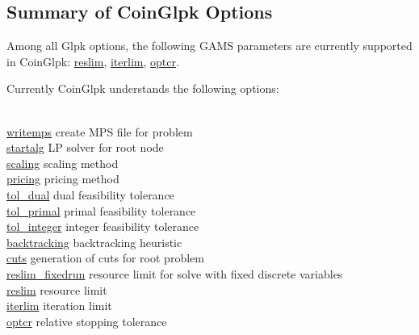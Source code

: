 \subsection{Summary of CoinGlpk Options}

Among all Glpk options, the following GAMS parameters are currently supported in CoinGlpk:
\hyperlink{glpkreslim}{reslim}, \hyperlink{glpkiterlim}{iterlim}, \hyperlink{glpkoptcr}{optcr}.

Currently CoinGlpk understands the following options:
\begin{tabbing}
\hspace {1.0in} \= \\
\hyperlink{glpkwritemps}
{writemps} \> create MPS file for problem \\
\hyperlink{glpkstartalg}
{startalg} \> LP solver for root node \\
\hyperlink{scaling}
{scaling} \> scaling method \\
\hyperlink{pricing}
{pricing} \> pricing method \\
\hyperlink{tol_dual}
{tol\_dual} \> dual feasibility tolerance \\
\hyperlink{tol_primal}
{tol\_primal} \> primal feasibility tolerance \\
\hyperlink{tol_integer}
{tol\_integer} \> integer feasibility tolerance \\
\hyperlink{backtracking}
{backtracking} \> backtracking heuristic \\
\hyperlink{glpkcuts}
{cuts} \> generation of cuts for root problem \\
\hyperlink{reslim_fixedrun}
{reslim_fixedrun} \> resource limit for solve with fixed discrete variables \\
\hyperlink{glpkreslim}
{reslim} \> resource limit \\
\hyperlink{glpkiterlim}
{iterlim} \> iteration limit \\
\hyperlink{glpkoptcr}
{optcr} \> relative stopping tolerance \\
\end{tabbing}

